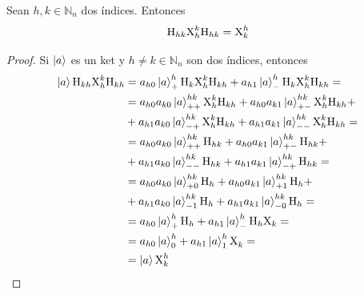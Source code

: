 \begin{proposition}
  Sean $h,k \in \mathbb{N}_n$ dos índices.
  Entonces
  \begin{equation}
    \text{H}_{hk}\text{X}^{k}_{h}\text{H}_{hk} = \text{X}^{h}_{k}
  \end{equation}
\end{proposition}
\begin{proof}
  Si $\ket{a}$ es un ket y $h\neq k \in \mathbb{N}_n$ son dos índices, entonces
  \begin{align*}
    \ket{a}\text{H}_{kh}\text{X}^{k}_{h}\text{H}_{kh}
     & =a_{h0}\ket{a}^{h}_{+}\text{H}_k\text{X}^{k}_{h}\text{H}_{kh} + a_{h1}\ket{a}^{h}_{-}\text{H}_k\text{X}^{k}_{h}\text{H}_{kh}=       \\
     & =a_{h0}a_{k0}\ket{a}^{hk}_{++}\text{X}^{k}_{h}\text{H}_{kh} + a_{h0}a_{k1}\ket{a}^{hk}_{+-}\text{X}^{k}_{h}\text{H}_{kh}+ \\
     & +a_{h1}a_{k0}\ket{a}^{hk}_{-+}\text{X}^{k}_{h}\text{H}_{kh} + a_{h1}a_{k1}\ket{a}^{hk}_{--}\text{X}^{k}_{h}\text{H}_{kh}= \\
     & =a_{h0}a_{k0}\ket{a}^{hk}_{++}\text{H}_{hk} + a_{h0}a_{k1}\ket{a}^{hk}_{+-}\text{H}_{hk}+                                       \\
     & +a_{h1}a_{k0}\ket{a}^{hk}_{--}\text{H}_{hk} + a_{h1}a_{k1}\ket{a}^{hk}_{-+}\text{H}_{hk}=                                       \\
     & =a_{h0}a_{k0}\ket{a}^{hk}_{+0}\text{H}_h + a_{h0}a_{k1}\ket{a}^{hk}_{+1}\text{H}_h+                                             \\
     & +a_{h1}a_{k0}\ket{a}^{hk}_{-1}\text{H}_h + a_{h1}a_{k1}\ket{a}^{hk}_{-0}\text{H}_h=                                             \\
     & =a_{h0}\ket{a}^{h}_{+}\text{H}_h+a_{h1}\ket{a}^{h}_{-}\text{H}_h\text{X}_k=                                                               \\
     & =a_{h0}\ket{a}^{h}_{0}+a_{h1}\ket{a}^{h}_{1}\text{X}^{}_{k}=                                                                           \\
     & =\ket{a}\text{X}^{h}_{k}
  \end{align*}
\end{proof}

